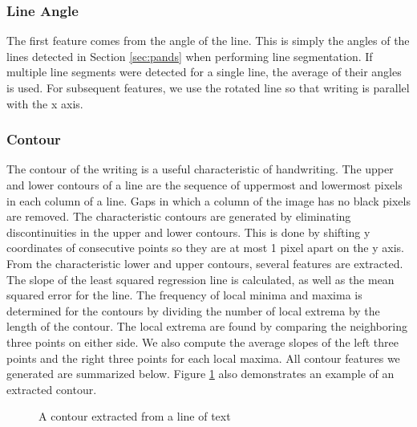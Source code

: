 \documentclass[paper=a4, fontsize=11pt]{scrartcl} %
\numberwithin{equation}{section} %
\numberwithin{figure}{section} %
\numberwithin{table}{section} %
\begin{document}
\subsubsection{Line Angle}
The first feature comes from the angle of the line. This is simply the
angles of the lines detected in Section \ref{sec:pands} when
performing line segmentation. If multiple line segments were detected
for a single line, the average of their angles is used. For subsequent
features, we use the rotated line so that writing is parallel with the
x axis.

\subsubsection{Contour}
The contour of the writing is a useful characteristic of
handwriting. The upper and lower contours of a line are the sequence
of uppermost and lowermost pixels in each column of a line. Gaps in
which a column of the image has no black pixels are removed. The
characteristic contours are generated by eliminating discontinuities
in the upper and lower contours. This is done by shifting y
coordinates of consecutive points so they are at most 1 pixel apart on
the y axis. From the characteristic lower and upper contours, several
features are extracted. The slope of the least squared regression line
is calculated, as well as the mean squared error for the line. The
frequency of local minima and maxima is determined for the contours by
dividing the number of local extrema by the length of the contour. The
local extrema are found by comparing the neighboring three points on
either side. We also compute the average slopes of the left three
points and the right three points for each local maxima. All contour
features we generated are summarized below. Figure
\ref{fig:contourimage} also demonstrates an example of an extracted
contour.

\begin{figure}
  \caption{A contour extracted from a line of text}
  \label{fig:contourimage}
\end{figure}
\end{document}

